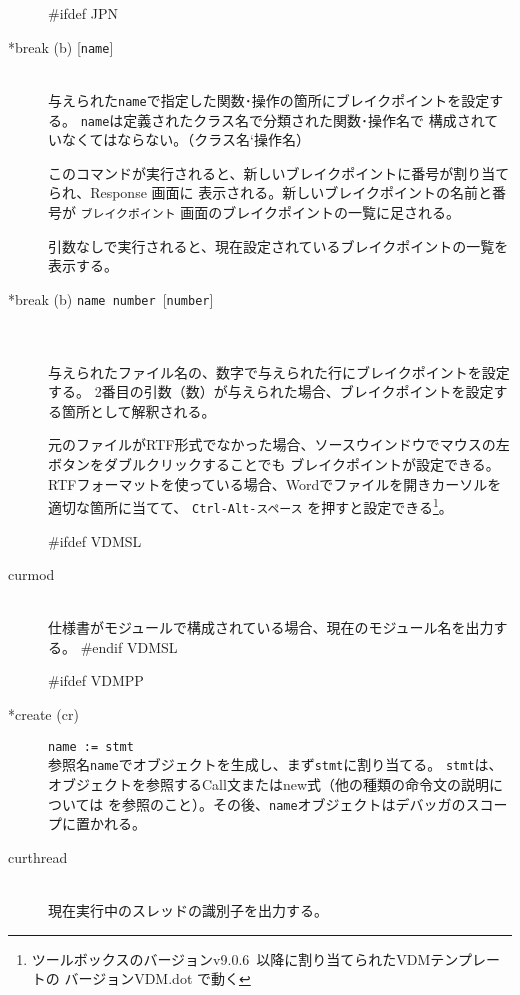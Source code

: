 \documentclass[\pformat,12pt]{article}
\newcommand{\vdmtoolsver}{v9.0.6}
\newcommand{\guicmd}[1]{{\sf #1}}
\newcommand{\guicmd}[1]{{\gt #1}}
\begin{document}
\begin{description}
#ifdef JPN
\item[*break (b) \mbox{[{\tt name}]}] 
\mbox{}\\
  与えられた{\tt name}で指定した関数･操作の箇所にブレイクポイントを設定する。
%
{%
{\tt name}は定義されたクラス名で分類された関数･操作名で
構成されていなくてはならない。（クラス名`操作名）
}%
{%
}

  このコマンドが実行されると、新しいブレイクポイントに番号が割り当てられ、\guicmd{Response} 画面に
  表示される。新しいブレイクポイントの名前と番号が \texttt{ブレイクポイント} 画面のブレイクポイントの一覧に足される。

  引数なしで実行されると、現在設定されているブレイクポイントの一覧を表示する。

\item[*break (b) \mbox{\texttt{name number} [\texttt{number}]}]\mbox{}\\
\mbox{}\\
 与えられたファイル名の、数字で与えられた行にブレイクポイントを設定する。
 2番目の引数（数）が与えられた場合、ブレイクポイントを設定する箇所として解釈される。

元のファイルがRTF形式でなかった場合、\guicmd{ソースウインドウ}でマウスの左ボタンをダブルクリックすることでも
ブレイクポイントが設定できる。
RTFフォーマットを使っている場合、Wordでファイルを開きカーソルを適切な箇所に当てて、
\texttt{Ctrl-Alt-スペース}%
を押すと設定できる\footnote{ツールボックスのバージョン\vdmtoolsver\ 以降に割り当てられたVDMテンプレートの
バージョンVDM.dot で動く}。 

#ifdef VDMSL
\item[curmod] \mbox{}\\
  仕様書がモジュールで構成されている場合、現在のモジュール名を出力する。
#endif VDMSL

#ifdef VDMPP
\item[*create (cr)] {\tt name := stmt}\mbox{}\\
  参照名{\tt name}でオブジェクトを生成し、まず{\tt stmt}に割り当てる。
  {\tt stmt}は、オブジェクトを参照するCall文またはnew式（他の種類の命令文の説明については
  \cite{LangManPP-CSK}を参照のこと）。その後、{\tt name}オブジェクトはデバッガのスコープに置かれる。
  
\item[curthread]\mbox{}\\
  現在実行中のスレッドの識別子を出力する。
  

\end{description}
\end{document}
